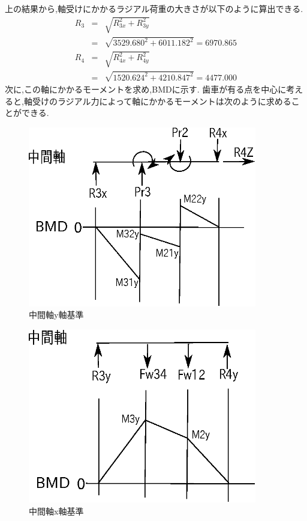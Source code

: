 上の結果から,軸受けにかかるラジアル荷重の大きさが以下のように算出できる.
\begin{eqnarray}
R_3 &=& \sqrt {R_{3x}^2+R_{3y}^2}\\
    &=& \sqrt {3529.680^2+6011.182^2}=6970.865\\
R_4 &=& \sqrt {R_{4x}^2+R_{4y}^2}\\
    &=& \sqrt {1520.624^2+4210.847^2}=4477.000
\end{eqnarray}
次に,この軸にかかるモーメントを求め,BMDに示す.
歯車が有る点を中心に考えると,軸受けのラジアル力によって軸にかかるモーメントは次のように求めることができる.
\begin{figure}[htbp]
\begin{center}
\includegraphics[width=10cm]{../picture/jiku44.eps}
\end{center}
\caption{中間軸y軸基準}
\end{figure}
\begin{figure}[htbp]
\begin{center}
\includegraphics[width=10cm]{../picture/jiku46.eps}
\end{center}
\caption{中間軸x軸基準}
\end{figure}
